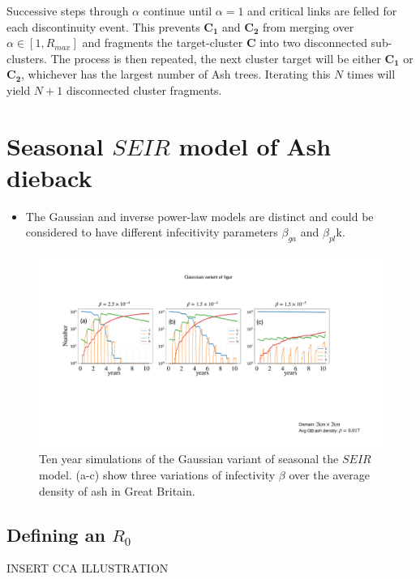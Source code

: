 Successive steps through $\alpha$ continue until $\alpha=1$ and critical links are felled for each discontinuity event. This prevents $\mathbf{C_1}$ and $\mathbf{C_2}$ from merging over $\alpha \in [1, R_{max}]$ and fragments the target-cluster $\mathbf{C}$ into two disconnected sub-clusters. The process is then repeated, the next cluster target will be either $\mathbf{C_1}$ or $\mathbf{C_2}$, whichever has the largest number of Ash trees. Iterating this $N$ times will yield $N+1$ disconnected cluster fragments.\\


\chapter{Seasonal $SEIR$ model of Ash dieback}

\label{section:ga-SEIR-variant}
\begin{itemize}
    \item The Gaussian and inverse power-law models are distinct and could be considered to have different infecitivity parameters $\beta_{ga}$ and $\beta_{pl}$k.
\end{itemize}
\begin{figure}
    \centering
    \includegraphics[scale=0.30]{appendix/figures/A-ch6-ga-seir.pdf}
    \caption{Ten year simulations of the Gaussian variant of seasonal the $SEIR$ model. (a-c) show three variations of infectivity $\beta$ over the average density of ash in Great Britain.}
    \label{fig-ga-SEIR-variant}
\end{figure}


\section{Defining an $R_0$}



INSERT CCA ILLUSTRATION